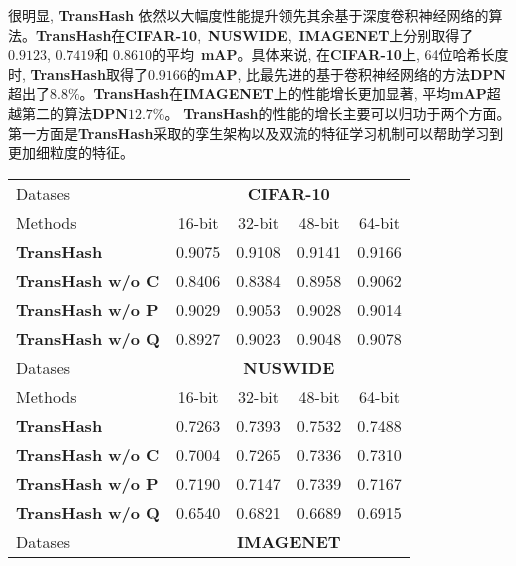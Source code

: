很明显, \textbf{TransHash} 依然以大幅度性能提升领先其余基于深度卷积神经网络的算法。\textbf{TransHash}在\textbf{CIFAR-10},~\textbf{NUSWIDE},~\textbf{IMAGENET}上分别取得了$0.9123 $, $0.7419$和 $0.8610$的平均~\textbf{mAP}。具体来说, 在\textbf{CIFAR-10}上, 64位哈希长度时, \textbf{TransHash}取得了$0.9166$的\textbf{mAP}, 比最先进的基于卷积神经网络的方法\textbf{DPN}超出了$8.8 \%$。\textbf{TransHash}在\textbf{IMAGENET}上的性能增长更加显著, 平均\textbf{mAP}超越第二的算法\textbf{DPN}$12.7\%$。 \textbf{TransHash}的性能的增长主要可以归功于两个方面。第一方面是\textbf{TransHash}采取的孪生架构以及双流的特征学习机制可以帮助学习到更加细粒度的特征。


\begin{table}[!htpb]
    \centering
    \begin{tabular}{cccccc}
       \\ \hline
    \multicolumn{2}{l|}{Datases} & \multicolumn{4}{c}{\textbf{CIFAR-10}} \\
    \multicolumn{2}{l|}{Methods} & 16-bit & 32-bit & 48-bit & 64-bit   \\\hline
    \hline
    \multicolumn{2}{l|}{\textbf{TransHash}} & 0.9075 & 0.9108 & 0.9141 & 0.9166  \\
    \multicolumn{2}{l|}{\textbf{TransHash w/o C}} & 0.8406 & 0.8384 & 0.8958 & 0.9062  \\
    \multicolumn{2}{l|}{\textbf{TransHash w/o P}} & 0.9029 & 0.9053 & 0.9028 & 0.9014  \\
    \multicolumn{2}{l|}{\textbf{TransHash w/o Q}} & 0.8927 & 0.9023 & 0.9048 & 0.9078  \\
    \hline
    \hline 
    \multicolumn{2}{l|}{Datases} & \multicolumn{4}{c}{\textbf{NUSWIDE}} \\
    \multicolumn{2}{l|}{Methods} & 16-bit & 32-bit & 48-bit & 64-bit   \\\hline
    \hline
    \multicolumn{2}{l|}{\textbf{TransHash}} & 0.7263 & 0.7393 & 0.7532 & 0.7488  \\
    \multicolumn{2}{l|}{\textbf{TransHash w/o C}} & 0.7004 & 0.7265 & 0.7336 & 0.7310  \\
    \multicolumn{2}{l|}{\textbf{TransHash w/o P}} & 0.7190 & 0.7147 & 0.7339 & 0.7167  \\
    \multicolumn{2}{l|}{\textbf{TransHash w/o Q}} & 0.6540 & 0.6821 & 0.6689 & 0.6915  \\
    \hline
    \hline 
    \multicolumn{2}{l|}{Datases} & \multicolumn{4}{c}{\textbf{IMAGENET}} \\

\end{tabular}
\end{table}
